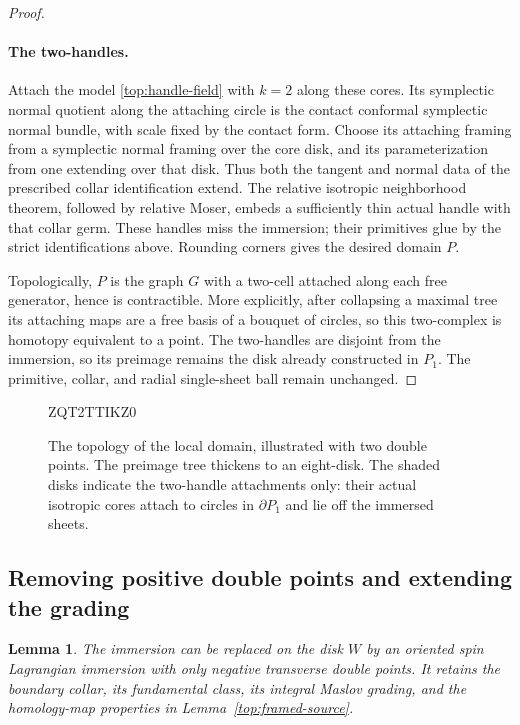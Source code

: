 \documentclass[11pt]{article}
\newtheorem{lemma}[theorem]{Lemma}
\theoremstyle{definition}
\theoremstyle{remark}
\numberwithin{equation}{section}
\begin{document}
\begin{proof}
\paragraph{The two-handles.}
Attach the model \eqref{top:handle-field} with $k=2$ along these
cores.  Its symplectic normal quotient along the attaching
circle is the contact conformal symplectic normal bundle,
with scale fixed by the contact form.  Choose its attaching
framing from a symplectic normal framing over the core disk,
and its parameterization from one extending over that disk.
Thus both the tangent and normal data of the prescribed collar
identification extend.  The relative isotropic neighborhood
theorem, followed by relative Moser, embeds a sufficiently thin
actual handle with that collar germ.  These handles miss the
immersion; their primitives glue by the strict identifications
above.  Rounding corners gives the desired domain $P$.

Topologically, $P$ is the graph $G$ with a two-cell attached
along each free generator, hence is contractible.  More
explicitly, after collapsing a maximal tree its attaching maps
are a free basis of a bouquet of circles, so this two-complex
is homotopy equivalent to a point.  The two-handles are
disjoint from the immersion, so its preimage remains the disk
already constructed in $P_1$.  The primitive, collar, and
radial single-sheet ball remain unchanged.
\end{proof}

\begin{figure}[tb]

ZQT2TTIKZ0
\caption{The topology of the local domain, illustrated with two double
points.  The preimage tree thickens to an eight-disk.  The shaded disks
indicate the two-handle attachments only: their actual isotropic cores
attach to circles in $\partial P_1$ and lie off the immersed sheets.}
\label{top:domain-figure}
\end{figure}

\subsection{Removing positive double points and extending the grading}

\begin{lemma}\label{top:negative-doubles}
The immersion can be replaced on the disk $W$ by an oriented spin
Lagrangian immersion with only negative transverse double points.
It retains the boundary collar, its fundamental class, its integral
Maslov grading, and the homology-map properties in
Lemma~\ref{top:framed-source}.
\end{lemma}
\end{document}
